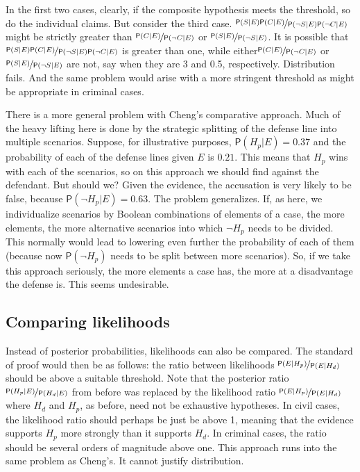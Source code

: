 \documentclass[
  10pt,
  dvipsnames,enabledeprecatedfontcommands]{scrartcl}
\newcommand{\n}{\neg}
\newcommand{\pr}[1]{\ensuremath{\mathsf{P}(#1)}}
\begin{document}
\noindent In the first two cases, clearly, if the composite hypothesis
meets the threshold, so do the individual claims. But consider the third
case.
\(\nicefrac{\pr{S\vert E}\pr{C\vert E}}{\pr{\n S \vert E}\pr{\n C \vert E}}\)
might be strictly greater than
\(\nicefrac{\pr{C\vert E}}{\pr{\n C \vert E}}\) or
\(\nicefrac{\pr{S\vert E}}{\pr{\n S \vert E}}\). It is possible that
\(\nicefrac{\pr{S\vert E}\pr{C\vert E}}{\pr{\n S \vert E}\pr{\n C \vert E}}\)
is greater than one, while
either\(\nicefrac{\pr{C\vert E}}{\pr{\n C \vert E}}\) or
\(\nicefrac{\pr{S\vert E}}{\pr{\n S \vert E}}\) are not, say when they
are 3 and 0.5, respectively. Distribution fails. And the same problem
would arise with a more stringent threshold as might be appropriate in
criminal cases.

There is a more general problem with Cheng's comparative approach. Much
of the heavy lifting here is done by the strategic splitting of the
defense line into multiple scenarios. Suppose, for illustrative
purposes, \(\pr{H_p\vert E}=0.37\) and the probability of each of the
defense lines given \(E\) is \(0.21\). This means that \(H_p\) wins with
each of the scenarios, so on this approach we should find against the
defendant. But should we? Given the evidence, the accusation is very
likely to be false, because \(\pr{\n H_p \vert E}=0.63\). The problem
generalizes. If, as here, we individualize scenarios by Boolean
combinations of elements of a case, the more elements, the more
alternative scenarios into which \(\n H_p\) needs to be divided. This
normally would lead to lowering even further the probability of each of
them (because now \(\pr{\n H_p}\) needs to be split between more
scenarios). So, if we take this approach seriously, the more elements a
case has, the more at a disadvantage the defense is. This seems
undesirable.

\hypertarget{comparing-likelihoods}{%
\subsection{Comparing likelihoods}\label{comparing-likelihoods}}

Instead of posterior probabilities, likelihoods can also be compared.
The standard of proof would then be as follows: the ratio between
likelihoods \(\nicefrac{\pr{E \vert H_p}}{\pr{E \vert H_d}}\) should be
above a suitable threshold. Note that the posterior ratio
\(\nicefrac{\pr{H_p \vert E}}{\pr{H_d \vert E}}\) from before was
replaced by the likelihood ratio
\(\nicefrac{\pr{E \vert H_p}}{\pr{E \vert H_d}}\) where \(H_d\) and
\(H_p\), as before, need not be exhaustive hypotheses. In civil cases,
the likelihood ratio should perhaps be just be above 1, meaning that the
evidence supports \(H_p\) more strongly than it supports \(H_d\). In
criminal cases, the ratio should be several orders of magnitude above
one. This approach runs into the same problem as Cheng's. It cannot
justify distribution.
\end{document}
